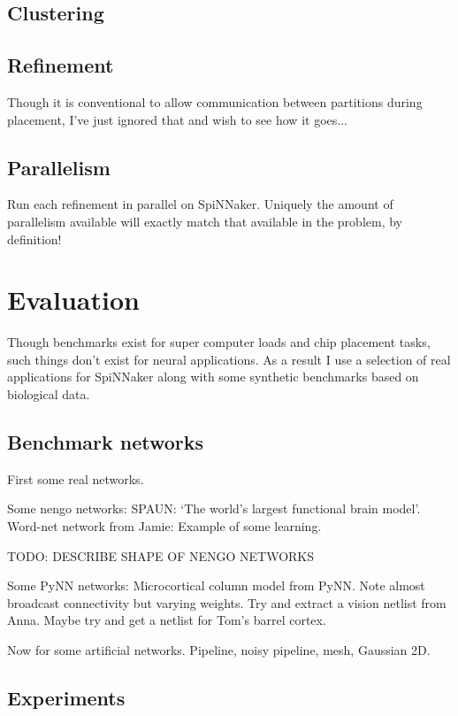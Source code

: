 		\subsection{Clustering}
		
		\subsection{Refinement}
			
			Though it is conventional to allow communication between partitions
			during placement, I've just ignored that and wish to see how it goes...
		
		\subsection{Parallelism}
			
			Run each refinement in parallel on SpiNNaker. Uniquely the amount of
			parallelism available will exactly match that available in the problem,
			by definition!
	
	\section{Evaluation}
		
		Though benchmarks exist for super computer loads and chip placement tasks,
		such things don't exist for neural applications. As a result I use a
		selection of real applications for SpiNNaker along with some synthetic
		benchmarks based on biological data.
		
		\subsection{Benchmark networks}
			
			First some real networks.
			
			Some nengo networks: SPAUN: `The world's largest functional brain model'.
			Word-net network from Jamie: Example of some learning.
			
			TODO: DESCRIBE SHAPE OF NENGO NETWORKS
			
			Some PyNN networks: Microcortical column model from PyNN. Note almost
			broadcast connectivity but varying weights. Try and extract a vision
			netlist from Anna. Maybe try and get a netlist for Tom's barrel cortex.
			
			Now for some artificial networks. Pipeline, noisy pipeline, mesh,
			Gaussian 2D.
		
		\subsection{Experiments}
			
